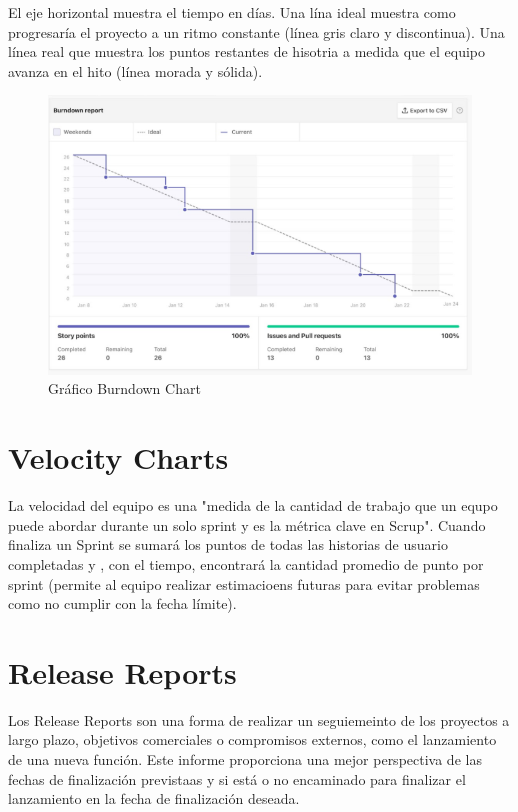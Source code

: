 \documentclass[11pt]{article}
\begin{document}
El eje horizontal muestra el tiempo en días.
Una lína ideal muestra como progresaría el proyecto a un ritmo constante (línea gris claro y discontinua).    
Una línea real que muestra los puntos restantes de hisotria a medida que el equipo avanza en el hito (línea morada y sólida).


\begin{figure}[h!] 
\centering
    \includegraphics[width=1\textwidth]{burndown-chart.PNG}
\caption{Gráfico Burndown Chart}
\label{fig:control}
\end{figure}


\section*{Velocity Charts}

La velocidad del equipo es una "medida de la cantidad de trabajo que un equpo puede abordar durante un solo sprint y es la métrica clave en Scrup". Cuando finaliza un Sprint se sumará los puntos de todas las historias de usuario completadas y , con el tiempo, encontrará la cantidad promedio de punto por sprint (permite al equipo realizar estimacioens futuras para evitar problemas como no cumplir con la fecha límite).

\section*{Release Reports}

Los Release Reports son una forma de realizar un seguiemeinto de los proyectos a largo plazo, objetivos comerciales o compromisos externos, como el lanzamiento de una nueva función. Este informe proporciona una mejor perspectiva de las fechas de finalización previstaas y si está o no encaminado para finalizar el lanzamiento en la fecha de finalización deseada. 
\end{document}
